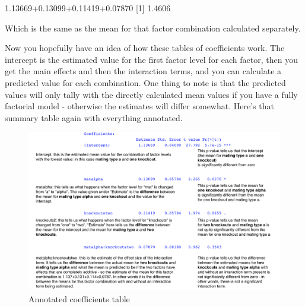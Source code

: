 \documentclass[
]{book}
\newenvironment{Shaded}{\begin{snugshade}}{\end{snugshade}}
\newcommand{\DecValTok}[1]{\textcolor[rgb]{0.00,0.00,0.81}{#1}}
\newcommand{\FloatTok}[1]{\textcolor[rgb]{0.00,0.00,0.81}{#1}}
\newcommand{\KeywordTok}[1]{\textcolor[rgb]{0.13,0.29,0.53}{\textbf{#1}}}
\newcommand{\NormalTok}[1]{#1}
\newcommand{\OperatorTok}[1]{\textcolor[rgb]{0.81,0.36,0.00}{\textbf{#1}}}
\newcommand{\StringTok}[1]{\textcolor[rgb]{0.31,0.60,0.02}{#1}}
\begin{document}
\begin{Shaded}
\begin{Highlighting}[]
\FloatTok{1.13669+0.13099+0.11419+0.07870}
\NormalTok{[}\DecValTok{1}\NormalTok{] }\FloatTok{1.4606}
\end{Highlighting}
\end{Shaded}

Which is the same as the mean for that factor combination calculated separately.

\begin{Shaded}
\end{Shaded}

Now you hopefully have an idea of how these tables of coefficients work. The intercept is the estimated value for the first factor level for each factor, then you get the main effects and then the interaction terms, and you can calculate a predicted value for each combination. One thing to note is that the predicted values will only tally with the directly calculated mean values if you have a fully factorial model - otherwise the estimates will differ somewhat. Here's that summary table again with everything annotated.

\begin{figure}
\centering
\includegraphics{Images/Yeast.coefficients.png}
\caption{Annotated coefficients table}
\end{figure}
\end{document}
